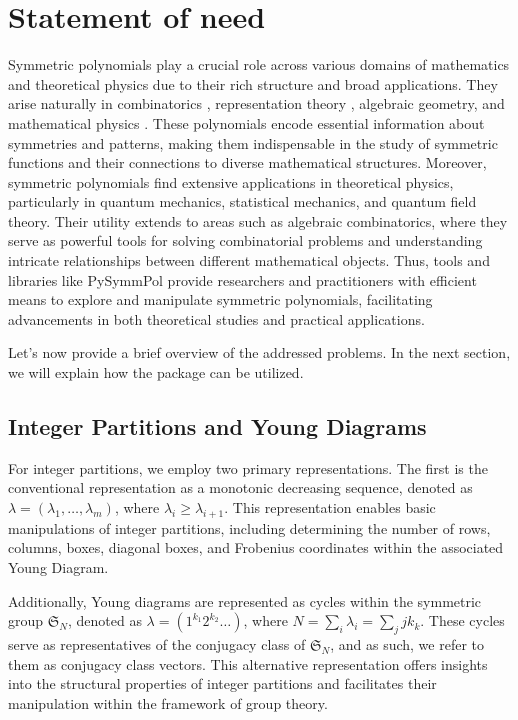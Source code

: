 \documentclass[a4paper,10pt]{amsart}
\begin{document}
\section{Statement of need}

Symmetric polynomials play a crucial role across various domains of
mathematics and theoretical physics due to their rich structure and
broad applications. They arise naturally in combinatorics \cite{Macdonald:1998}, 
representation theory \cite{Fulton:2004}, algebraic geometry, and mathematical
physics \cite{Babelon:2003, Wheeler:2010}. These polynomials encode
essential information about symmetries and patterns, making them
indispensable in the study of symmetric functions and their
connections to diverse mathematical structures. Moreover, symmetric
polynomials find extensive applications in theoretical physics,
particularly in quantum mechanics, statistical mechanics, and quantum
field theory. Their utility extends to areas such as algebraic
combinatorics, where they serve as powerful tools for solving
combinatorial problems and understanding intricate relationships
between different mathematical objects. Thus, tools and libraries like
PySymmPol provide researchers and practitioners with efficient means
to explore and manipulate symmetric polynomials, facilitating
advancements in both theoretical studies and practical applications.
 
Let's now provide a brief overview of the addressed problems. In the
next section, we will explain how the package can be utilized.

\subsection{Integer Partitions and Young Diagrams}

For integer partitions, we employ two primary representations. The
first is the conventional representation as a monotonic decreasing
sequence, denoted as $\lambda = (\lambda_1, \dots, \lambda_m)$, where
$\lambda_i \geq \lambda_{i+1}$. This representation enables basic
manipulations of integer partitions, including determining the number
of rows, columns, boxes, diagonal boxes, and Frobenius coordinates
within the associated Young Diagram.

Additionally, Young diagrams are represented as cycles within the
symmetric group $\mathfrak{S}_N$, denoted as $\lambda = (1^{k_1}
2^{k_2} \dots)$, where $N = \sum_i\lambda_i = \sum_j j k_k$. These
cycles serve as representatives of the conjugacy class of
$\mathfrak{S}_N$, and as such, we refer to them as conjugacy class
vectors. This alternative representation offers insights into the
structural properties of integer partitions and facilitates their
manipulation within the framework of group theory.
\end{document}
